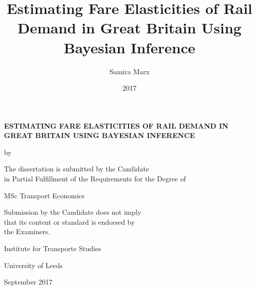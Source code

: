 \documentclass[12pt,oneside,a4paper]{report}
\title{Estimating Fare Elasticities of Rail Demand in Great Britain Using Bayesian Inference}
\author{Samira Marx}
\date{2017}
\begin{document}
\renewcommand{\thepage}{\roman{page}} %

\begin{titlepage}
    \begin{center}
        \vspace*{1cm}
        
        \textbf{ESTIMATING FARE ELASTICITIES OF RAIL DEMAND IN GREAT BRITAIN USING BAYESIAN INFERENCE}
        
        \vspace{1.5cm}

		by

        \vspace{1.5cm}
        
        
        \vspace{1.5cm}

        
        The dissertation is submitted by the Candidate \\
        in Partial Fulfillment of the Requirements for the Degree of

        \vspace{1.5cm}

		MSc Transport Economics
        
        \vspace{1.5cm}

Submission by the Candidate does not imply \\
that its content or standard is endorsed by \\
the Examiners.

        \vfill
        
        Institute for Transporte Studies

		\vspace{0.3cm}

        University of Leeds
        
		\vspace{0.3cm}

        September 2017
        
    \end{center}
\end{titlepage}

\setcounter{tocdepth}{1}
\tableofcontents

\pagebreak

\listoffigures
 
\listoftables

\pagebreak
\end{document}
